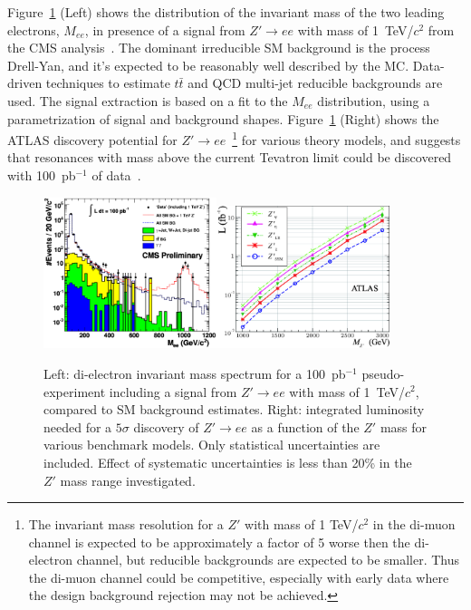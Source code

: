 \documentclass{cimento}
\begin{document}
Figure~\ref{fig:MeeAndZPrimeDisc} (Left) shows the distribution of 
the invariant mass of the two leading electrons, $M_{ee}$, in presence of 
a signal from $Z' \rightarrow ee$ with mass of 1~TeV/$c^2$
from the CMS analysis~\cite{HEEPNOTE}. The dominant irreducible SM background 
is the process Drell-Yan, and it's expected to be 
reasonably well described by the MC. Data-driven techniques to estimate $t\bar{t}$ and QCD multi-jet
reducible backgrounds are used. The signal extraction is based on a fit 
to the $M_{ee}$ distribution, using a parametrization of signal and 
background shapes. Figure~\ref{fig:MeeAndZPrimeDisc} (Right)
shows the ATLAS discovery potential for 
$Z' \rightarrow ee$~\footnote{The invariant mass resolution for a $Z'$ 
with mass of 1 TeV/$c^2$ in the di-muon channel is expected to be approximately 
a factor of 5 worse then the di-electron channel, 
but reducible backgrounds are expected to be smaller. 
Thus the di-muon channel could be competitive, 
especially with early data where the design background rejection may not be 
achieved.} for various theory 
models, and suggests that resonances with mass 
above the current Tevatron limit could be discovered with 
100~pb$^{-1}$ of data~\cite{DiLepResonancesATLAS}. 

\begin{figure}[htbp] 
\centering
\includegraphics[width=0.45\textwidth]{st_mass_all_withZPrime_ALLTOPO.eps}\includegraphics[width=0.45\textwidth]{fig9L.eps}
\caption{Left: di-electron invariant mass spectrum for a 
100~pb$^{-1}$ pseudo-experiment including a signal from 
$Z' \rightarrow ee$ with mass of 1~TeV/$c^2$, 
compared to SM background estimates. Right: integrated 
luminosity needed for a $5\sigma$ discovery of $Z' \rightarrow ee$
as a function of the $Z'$ mass for various benchmark models. Only 
statistical uncertainties are included. 
Effect of systematic uncertainties is less than 20\% in the $Z'$ mass
range investigated.}
\label{fig:MeeAndZPrimeDisc}
\end{figure}
\end{document}
